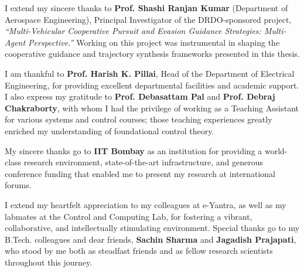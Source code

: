 I extend my sincere thanks to \textbf{Prof. Shashi Ranjan Kumar} (Department of Aerospace Engineering), Principal Investigator of the DRDO-sponsored project, \textit{``Multi-Vehicular Cooperative Pursuit and Evasion Guidance Strategies: Multi-Agent Perspective.''} Working on this project was instrumental in shaping the cooperative guidance and trajectory synthesis frameworks presented in this thesis.

I am thankful to \textbf{Prof. Harish K. Pillai}, Head of the Department of Electrical Engineering, for providing excellent departmental facilities and academic support. I also express my gratitude to \textbf{Prof. Debasattam Pal} and \textbf{Prof. Debraj Chakraborty}, with whom I had the privilege of working as a Teaching Assistant for various systems and control courses; those teaching experiences greatly enriched my understanding of foundational control theory.

My sincere thanks go to \textbf{IIT Bombay} as an institution for providing a world-class research environment, state-of-the-art infrastructure, and generous conference funding that enabled me to present my research at international forums.

I extend my heartfelt appreciation to my colleagues at e-Yantra, as well as my labmates at the Control and Computing Lab, for fostering a vibrant, collaborative, and intellectually stimulating environment. Special thanks go to my B.Tech. colleagues and dear friends, \textbf{Sachin Sharma} and \textbf{Jagadish Prajapati}, who stood by me both as steadfast friends and as fellow research scientists throughout this journey.


